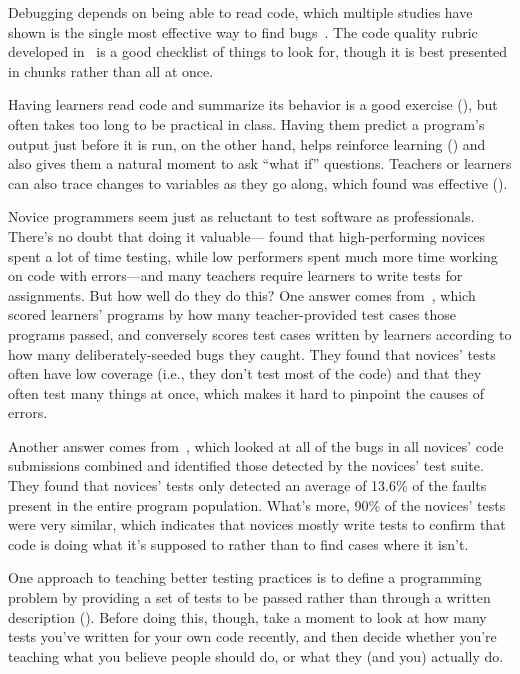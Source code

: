 Debugging depends on being able to read code,
which multiple studies have shown is the single most effective way to find bugs~\cite{Basi1987,Keme2009,Bacc2013}.
The code quality rubric developed in~\cite{Steg2014,Steg2016a}
is a good checklist of things to look for,
though it is best presented in chunks rather than all at once.

Having learners read code and summarize its behavior is a good exercise (),
but often takes too long to be practical in class.
Having them predict a program's output just before it is run,
on the other hand,
helps reinforce learning ()
and also gives them a natural moment to ask ``what if'' questions.
Teachers or learners can also trace changes to variables as they go along,
which \cite{Cunn2017} found was effective ().


Novice programmers seem just as reluctant to test software as professionals.
There's no doubt that doing it valuable---\cite{Cart2017} found that high-performing novices spent a lot of time testing,
while low performers spent much more time working on code with errors---and many teachers
require learners to write tests for assignments.
But how well do they do this?
One answer comes from~\cite{Bria2015},
which scored learners' programs by how many teacher-provided test cases those programs passed,
and conversely scores test cases written by learners according to how many deliberately-seeded bugs they caught.
They found that novices' tests often have low coverage (i.e., they don't test most of the code)
and that they often test many things at once, which makes it hard to pinpoint the causes of errors.

Another answer comes from~\cite{Edwa2014b},
which looked at all of the bugs in all novices' code submissions combined
and identified those detected by the novices' test suite.
They found that novices' tests only detected an average of 13.6\% of the faults present in the entire program population.
What's more,
90\% of the novices' tests were very similar,
which indicates that novices mostly write tests to confirm that code is doing what it's supposed to
rather than to find cases where it isn't.

One approach to teaching better testing practices is
to define a programming problem by providing a set of tests to be passed
rather than through a written description ().
Before doing this,
though,
take a moment to look at how many tests you've written for your own code recently,
and then decide whether you're teaching what you believe people should do,
or what they (and you) actually do.

